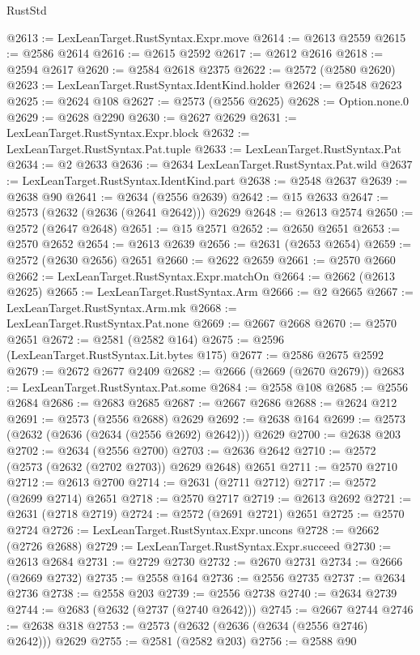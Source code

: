 \begin{lexlean}{RustStd}
\begin{coremodule}
@2613 := LexLeanTarget.RustSyntax.Expr.move
@2614 := @2613 @2559
@2615 := @2586 @2614
@2616 := @2615 @2592
@2617 := @2612 @2616
@2618 := @2594 @2617
@2620 := @2584 @2618 @2375
@2622 := @2572 (@2580 @2620)
@2623 := LexLeanTarget.RustSyntax.IdentKind.holder
@2624 := @2548 @2623
@2625 := @2624 @108
@2627 := @2573 (@2556 @2625)
@2628 := Option.none.{0}
@2629 := @2628 @2290
@2630 := @2627 @2629
@2631 := LexLeanTarget.RustSyntax.Expr.block
@2632 := LexLeanTarget.RustSyntax.Pat.tuple
@2633 := LexLeanTarget.RustSyntax.Pat
@2634 := @2 @2633
@2636 := @2634 LexLeanTarget.RustSyntax.Pat.wild
@2637 := LexLeanTarget.RustSyntax.IdentKind.part
@2638 := @2548 @2637
@2639 := @2638 @90
@2641 := @2634 (@2556 @2639)
@2642 := @15 @2633
@2647 := @2573 (@2632 (@2636 (@2641 @2642))) @2629
@2648 := @2613 @2574
@2650 := @2572 (@2647 @2648)
@2651 := @15 @2571
@2652 := @2650 @2651
@2653 := @2570 @2652
@2654 := @2613 @2639
@2656 := @2631 (@2653 @2654)
@2659 := @2572 (@2630 @2656) @2651
@2660 := @2622 @2659
@2661 := @2570 @2660
@2662 := LexLeanTarget.RustSyntax.Expr.matchOn
@2664 := @2662 (@2613 @2625)
@2665 := LexLeanTarget.RustSyntax.Arm
@2666 := @2 @2665
@2667 := LexLeanTarget.RustSyntax.Arm.mk
@2668 := LexLeanTarget.RustSyntax.Pat.none
@2669 := @2667 @2668
@2670 := @2570 @2651
@2672 := @2581 (@2582 @164)
@2675 := @2596 (LexLeanTarget.RustSyntax.Lit.bytes @175)
@2677 := @2586 @2675 @2592
@2679 := @2672 @2677 @2409
@2682 := @2666 (@2669 (@2670 @2679))
@2683 := LexLeanTarget.RustSyntax.Pat.some
@2684 := @2558 @108
@2685 := @2556 @2684
@2686 := @2683 @2685
@2687 := @2667 @2686
@2688 := @2624 @212
@2691 := @2573 (@2556 @2688) @2629
@2692 := @2638 @164
@2699 := @2573 (@2632 (@2636 (@2634 (@2556 @2692) @2642))) @2629
@2700 := @2638 @203
@2702 := @2634 (@2556 @2700)
@2703 := @2636 @2642
@2710 := @2572 (@2573 (@2632 (@2702 @2703)) @2629 @2648) @2651
@2711 := @2570 @2710
@2712 := @2613 @2700
@2714 := @2631 (@2711 @2712)
@2717 := @2572 (@2699 @2714) @2651
@2718 := @2570 @2717
@2719 := @2613 @2692
@2721 := @2631 (@2718 @2719)
@2724 := @2572 (@2691 @2721) @2651
@2725 := @2570 @2724
@2726 := LexLeanTarget.RustSyntax.Expr.uncons
@2728 := @2662 (@2726 @2688)
@2729 := LexLeanTarget.RustSyntax.Expr.succeed
@2730 := @2613 @2684
@2731 := @2729 @2730
@2732 := @2670 @2731
@2734 := @2666 (@2669 @2732)
@2735 := @2558 @164
@2736 := @2556 @2735
@2737 := @2634 @2736
@2738 := @2558 @203
@2739 := @2556 @2738
@2740 := @2634 @2739
@2744 := @2683 (@2632 (@2737 (@2740 @2642)))
@2745 := @2667 @2744
@2746 := @2638 @318
@2753 := @2573 (@2632 (@2636 (@2634 (@2556 @2746) @2642))) @2629
@2755 := @2581 (@2582 @203)
@2756 := @2588 @90

\end{coremodule}
\end{lexlean}

